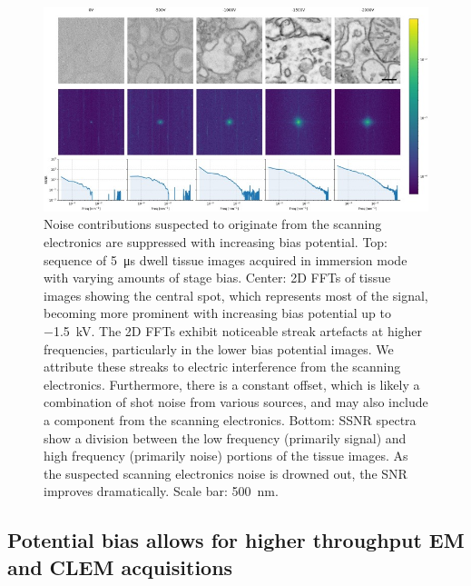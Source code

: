 \begin{figure}[!tb]
    \centering
    \includegraphics[width=\linewidth]{chapter-2/figures_JPEG_LQ/fig2-5_noise.jpg}
    \caption{Noise contributions suspected to originate from the scanning electronics are suppressed with increasing bias potential. Top: sequence of \SI{5}{\micro\second} dwell tissue images acquired in immersion mode with varying amounts of stage bias. Center: 2D FFTs of tissue images showing the central spot, which represents most of the signal, becoming more prominent with increasing bias potential up to \SI{-1.5}{\kilo\volt}. The 2D FFTs exhibit noticeable streak artefacts at higher frequencies, particularly in the lower bias potential images. We attribute these streaks to electric interference from the scanning electronics. Furthermore, there is a constant offset, which is likely a combination of shot noise from various sources, and may also include a component from the scanning electronics. Bottom: SSNR spectra show a division between the low frequency (primarily signal) and high frequency (primarily noise) portions of the tissue images. As the suspected scanning electronics noise is drowned out, the SNR improves dramatically. Scale bar: \SI{500}{\nano\meter}.}
    \label{fig:2.5_noise}
\end{figure}


\subsection{Potential bias allows for higher throughput EM and CLEM acquisitions}

